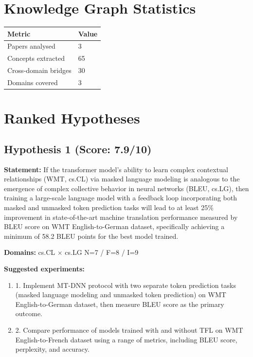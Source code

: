 \documentclass[12pt,a4paper]{article}
\begin{document}
\section{Knowledge Graph Statistics}

\begin{tabular}{ll}
\toprule
Metric & Value \\
\midrule
Papers analysed   & 3 \\
Concepts extracted & 65 \\
Cross-domain bridges & 30 \\
Domains covered   & 3 \\
\bottomrule
\end{tabular}

\section{Ranked Hypotheses}

\subsection*{Hypothesis 1 (Score: 7.9/10)}

\textbf{Statement:} If the transformer model's ability to learn complex contextual relationships (WMT, cs.CL) via masked language modeling is analogous to the emergence of complex collective behavior in neural networks (BLEU, cs.LG), then training a large-scale language model with a feedback loop incorporating both masked and unmasked token prediction tasks will lead to at least 25\% improvement in state-of-the-art machine translation performance measured by BLEU score on WMT English-to-German dataset, specifically achieving a minimum of 58.2 BLEU points for the best model trained.

\noindent\textbf{Domains:} cs.CL $\times$ cs.LG
\hspace{1em} N=7 / F=8 / I=9

\textbf{Suggested experiments:}
\begin{enumerate}
  \item 1. Implement MT-DNN protocol with two separate token prediction tasks (masked language modeling and unmasked token prediction) on WMT English-to-German dataset, then measure BLEU score as the primary outcome.
  \item 2. Compare performance of models trained with and without TFL on WMT English-to-French dataset using a range of metrics, including BLEU score, perplexity, and accuracy.
\end{enumerate}
\end{document}
